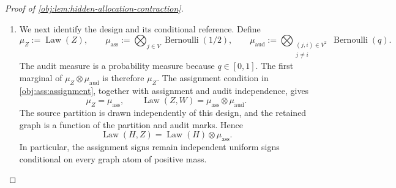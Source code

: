 \begin{proof}[Proof of \cref{obj:lem:hidden-allocation-contraction}]
\begin{enumerate}
The falling-factorial formula for binomial coefficients gives
\[
\binom B{\nu_{\mathrm{rev}}}
\le\frac{B^{\nu_{\mathrm{rev}}}}{\nu_{\mathrm{rev}}!},
\qquad
\binom{B-\nu_{\mathrm{rev}}}{\nu_{\mathrm{hid}}}
\le\frac{B^{\nu_{\mathrm{hid}}}}{\nu_{\mathrm{hid}}!}.
\]
Using \(B>0\) and the definition of \(\rho\), we obtain
\[
\begin{aligned}
&\binom B{\nu_{\mathrm{rev}}}
\binom{B-\nu_{\mathrm{rev}}}{\nu_{\mathrm{hid}}}
\rho_{\nu_{\mathrm{rev}},\nu_{\mathrm{hid}}}^{\nu_{\mathrm{hid}}}
\\
&\qquad\le
\frac{B^{\nu_{\mathrm{rev}}}}{\nu_{\mathrm{rev}}!}
4^{\nu_{\mathrm{hid}}}
\frac{(\nu_{\mathrm{rev}}+\nu_{\mathrm{hid}})^{\nu_{\mathrm{hid}}}}
{\nu_{\mathrm{hid}}!}
\\
&\qquad\le
\frac{B^{\nu_{\mathrm{rev}}}}{\nu_{\mathrm{rev}}!}
4^{\nu_{\mathrm{hid}}}
\exp(\nu_{\mathrm{rev}}+\nu_{\mathrm{hid}})
=
\frac{(eB)^{\nu_{\mathrm{rev}}}}{\nu_{\mathrm{rev}}!}
(4e)^{\nu_{\mathrm{hid}}}.
\end{aligned}
\]
The second inequality bounds one nonnegative term of the exponential series by its sum. It includes \(\nu_{\mathrm{hid}}=0\), with the stated power convention. Thus
\[
\begin{aligned}
\mathfrak S_{\mathrm{nc}}+1
&\le
\left(
\sum_{\nu_{\mathrm{rev}}=0}^B
\frac{(eBp\eta_1)^{\nu_{\mathrm{rev}}}}{\nu_{\mathrm{rev}}!}
\right)
\left(
\sum_{\nu_{\mathrm{hid}}=0}^B
(4e\eta)^{\nu_{\mathrm{hid}}}
\right)
\\
&\le
\exp(eBp\eta_1)\sum_{\nu_{\mathrm{hid}}=0}^{\infty}
(4e\eta)^{\nu_{\mathrm{hid}}}
=
\frac{\exp(eBp\eta_1)}{1-4e\eta}.
\end{aligned}
\]
Here \(0\le4e\eta<1\) justifies the geometric series. Therefore
\[
\mathfrak S_{\mathrm{nc}}
\le
\frac{\exp(eBp\eta_1)}{1-4e\eta}-1.
\]

\item We next identify the design and its conditional reference. Define
\[
\mu_Z:=\operatorname{Law}(Z),
\qquad
\mu_{\mathrm{ass}}
:=
\bigotimes_{j\in V}\operatorname{Bernoulli}(1/2),
\qquad
\mu_{\mathrm{aud}}
:=
\bigotimes_{\substack{(j,i)\in V^2\\j\ne i}}
\operatorname{Bernoulli}(q).
\]
The audit measure is a probability measure because \(q\in[0,1]\).
The first marginal of \(\mu_Z\otimes\mu_{\mathrm{aud}}\) is therefore
\(\mu_Z\). The assignment condition in
\cref{obj:ass:assignment}, together with assignment and audit independence, gives
\[
\mu_Z=\mu_{\mathrm{ass}},
\qquad
\operatorname{Law}(Z,W)
=
\mu_{\mathrm{ass}}\otimes\mu_{\mathrm{aud}}.
\]
The source partition is drawn independently of this design, and the retained graph is a function of the partition and audit marks. Hence
\[
\operatorname{Law}(H,Z)
=
\operatorname{Law}(H)\otimes\mu_{\mathrm{ass}}.
\]
In particular, the assignment signs remain independent uniform signs conditional on every graph atom of positive mass.


\end{enumerate}
\end{proof}
